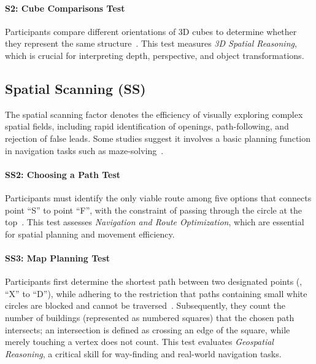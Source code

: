 \paragraph{S2: Cube Comparisons Test}

Participants compare different orientations of 3D cubes to determine whether they represent the same structure~\cite[31-32]{thurstone1938primary}.
This test measures \textit{3D Spatial Reasoning}, which is crucial for interpreting depth, perspective, and object transformations.

\subsection{Spatial Scanning (SS)}

The spatial scanning factor denotes the efficiency of visually exploring complex spatial fields, including rapid identification of openings, path-following, and rejection of false leads.
Some studies suggest it involves a basic planning function in navigation tasks such as maze-solving~\cite{carroll1976psychometric}.

\paragraph{SS2: Choosing a Path Test}

Participants must identify the only viable route among five options that connects point ``S'' to point ``F'', with the constraint of passing through the circle at the top~\cite{harrell1949printed}.
This test assesses \textit{Navigation and Route Optimization}, which are essential for spatial planning and movement efficiency.

\paragraph{SS3: Map Planning Test}

Participants first determine the shortest path between two designated points (\eg, ``X'' to ``D''), while adhering to the restriction that paths containing small white circles are blocked and cannot be traversed~\cite{harrell1949printed}.
Subsequently, they count the number of buildings (represented as numbered squares) that the chosen path intersects; an intersection is defined as crossing an edge of the square, while merely touching a vertex does not count.
This test evaluates \textit{Geospatial Reasoning}, a critical skill for way-finding and real-world navigation tasks.

